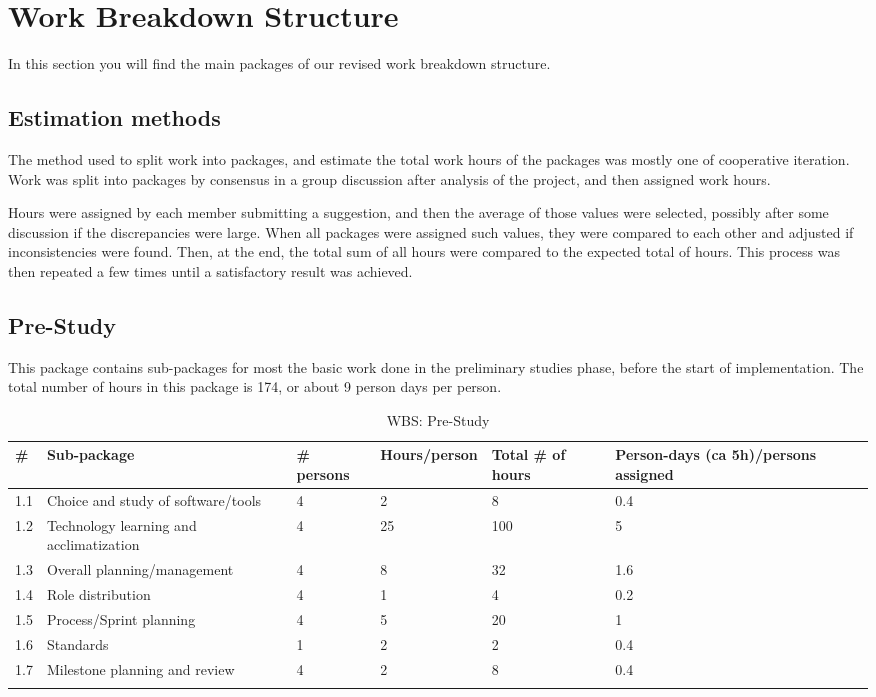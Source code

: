 \section{Work Breakdown Structure}
In this section you will find the main packages of our revised work breakdown structure.

\subsection{Estimation methods}

The method used to split work into packages, and estimate the total work hours of the packages was mostly one of cooperative iteration. Work was split into packages by consensus in a group discussion after analysis of the project, and then assigned work hours.

Hours were assigned by each member submitting a suggestion, and then the average of those values were selected, possibly after some discussion if the discrepancies were large. When all packages were assigned such values, they were compared to each other and adjusted if inconsistencies were found. Then, at the end, the total sum of all hours were compared to the expected total of hours. This process was then repeated a few times until a satisfactory result was achieved.

\newpage
\subsection{Pre-Study}
This package contains sub-packages for most the basic work done in the preliminary studies phase, before the start of implementation. The total number of hours in this package is 174, or about 9 person days per person.
\begin{longtable}{|p{0.7cm}|p{3cm}|p{1.8cm}|p{2.5cm}|p{2cm}|p{2.8cm}|}
\hline
\# & Sub-package & \# persons & Hours/person & Total \# of hours & Person-days (ca 5h)/persons assigned\\ 
\hline
1.1 & Choice and study of software/tools & 4 & 2 & 8 & 0.4\\ 
\hline
1.2 & Technology learning and acclimatization & 4 & 25 & 100 & 5\\ 
\hline
1.3 & Overall planning/management & 4 & 8 & 32 & 1.6\\ 
\hline
1.4 & Role distribution & 4 & 1 & 4 & 0.2\\ 
\hline
1.5 & Process/Sprint planning & 4 & 5 & 20 & 1\\ 
\hline
1.6 & Standards & 1 & 2 & 2 & 0.4\\ 
\hline
1.7 & Milestone planning and review & 4 & 2 & 8 & 0.4\\ 
\hline
\caption{WBS: Pre-Study}
\end{longtable}

